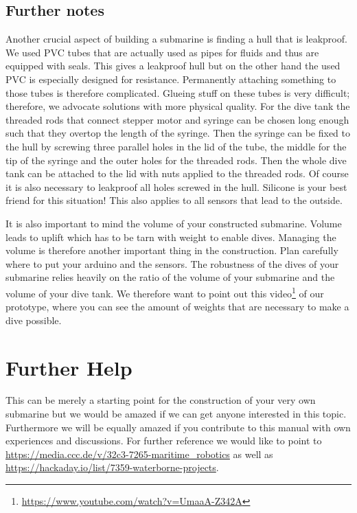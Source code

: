 \documentclass{tufte-handout}
\begin{document}
\subsection{Further notes}
Another crucial aspect of building a submarine is finding a hull that is
leakproof. We used PVC tubes that are actually used as pipes for fluids and
thus are equipped with seals. This gives a leakproof hull but on the other hand
the used PVC is especially designed for resistance. Permanently attaching
something to those tubes is therefore complicated. Glueing stuff on these tubes
is very difficult; therefore, we advocate solutions with more physical quality.
For the dive tank the threaded rods that connect stepper motor and syringe
can be chosen long enough such that they overtop the length of the syringe.
Then the syringe can be fixed to the hull by screwing three parallel holes in
the lid of the tube, the middle for the tip of the syringe and the outer holes
for the threaded rods. Then the whole dive tank can be attached to the lid with
nuts applied to the threaded rods. Of course it is also necessary to leakproof
all holes screwed in the hull. Silicone is your best friend for this situation!
This also applies to all sensors that lead to the outside.

It is also important to mind the volume of your constructed submarine. Volume leads to
uplift which has to be tarn with weight to enable dives. Managing the volume is
therefore another important thing in the construction. Plan carefully where to
put your arduino and the sensors. The robustness of the dives of your submarine
relies heavily on the ratio of the volume of your submarine and the volume of
your dive tank. We therefore want to point out this
video\footnote{\url{https://www.youtube.com/watch?v=UmaaA-Z342A}} of our
prototype, where you can see the amount of weights that are necessary to make a
dive possible.

\section{Further Help}
This can be merely a starting point for the construction of your very own
submarine but we would be amazed if we can get anyone interested in this topic.
Furthermore we will be equally amazed if you contribute to this manual with own
experiences and discussions.
For further reference we would like to point to
\url{https://media.ccc.de/v/32c3-7265-maritime_robotics} as well as
\url{https://hackaday.io/list/7359-waterborne-projects}.
\end{document}
